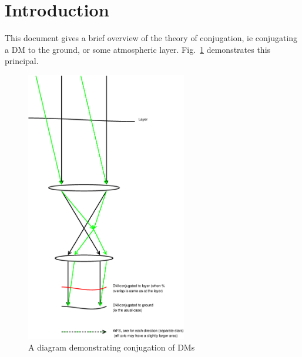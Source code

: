 \documentclass{article}
\begin{document}

\renewcommand{\esotitle}{DM conjugation introduction}
\renewcommand{\esodocno}{AOSIM-DMC-UoD-001}
\renewcommand{\releasedate}{070329}

\section{Introduction}
This document gives a brief overview of the theory of conjugation, ie
conjugating a DM to the ground, or some atmospheric layer.
Fig.~\ref{fig:conjugation} demonstrates this principal.  


\begin{figure}
\includegraphics[width=7cm]{conjugation.eps}
\caption{A diagram demonstrating conjugation of DMs}
\label{fig:conjugation}
\end{figure}


\printindex
\end{document}
